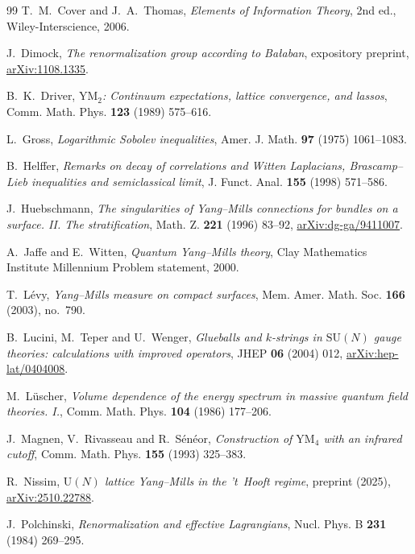 \documentclass[11pt,reqno]{amsart}
\theoremstyle{plain}
\theoremstyle{definition}
\theoremstyle{remark}
\begin{document}
\begin{thebibliography}{99}
 T.~M.~Cover and J.~A.~Thomas, \emph{Elements of Information Theory}, 2nd ed., Wiley-Interscience, 2006.

 J.~Dimock, \emph{The renormalization group according to Bałaban}, expository preprint, \href{https://arxiv.org/abs/1108.1335}{arXiv:1108.1335}.

 B.~K.~Driver, \emph{$\mathrm{YM}_2$: Continuum expectations, lattice convergence, and lassos}, Comm. Math. Phys. \textbf{123} (1989) 575--616.

 L.~Gross, \emph{Logarithmic Sobolev inequalities}, Amer. J. Math. \textbf{97} (1975) 1061--1083.

 B.~Helffer, \emph{Remarks on decay of correlations and Witten Laplacians, Brascamp--Lieb inequalities and semiclassical limit}, J. Funct. Anal. \textbf{155} (1998) 571--586.

 J.~Huebschmann, \emph{The singularities of Yang--Mills connections for bundles on a surface. II. The stratification}, Math. Z. \textbf{221} (1996) 83--92, \href{https://arxiv.org/abs/dg-ga/9411007}{arXiv:dg-ga/9411007}.

 A.~Jaffe and E.~Witten, \emph{Quantum Yang--Mills theory}, Clay Mathematics Institute Millennium Problem statement, 2000.

 T.~L\'evy, \emph{Yang--Mills measure on compact surfaces}, Mem. Amer. Math. Soc. \textbf{166} (2003), no.~790.

 B.~Lucini, M.~Teper and U.~Wenger, \emph{Glueballs and $k$-strings in $\mathrm{SU}(N)$ gauge theories: calculations with improved operators}, JHEP \textbf{06} (2004) 012, \href{https://arxiv.org/abs/hep-lat/0404008}{arXiv:hep-lat/0404008}.

 M.~L\"uscher, \emph{Volume dependence of the energy spectrum in massive quantum field theories. I.}, Comm. Math. Phys. \textbf{104} (1986) 177--206.

 J.~Magnen, V.~Rivasseau and R.~S\'en\'eor, \emph{Construction of $\mathrm{YM}_4$ with an infrared cutoff}, Comm. Math. Phys. \textbf{155} (1993) 325--383.

 R.~Nissim, \emph{$\mathrm{U}(N)$ lattice Yang--Mills in the 't~Hooft regime}, preprint (2025), \href{https://arxiv.org/abs/2510.22788}{arXiv:2510.22788}.

 J.~Polchinski, \emph{Renormalization and effective Lagrangians}, Nucl. Phys. B \textbf{231} (1984) 269--295.


\end{thebibliography}
\end{document}
